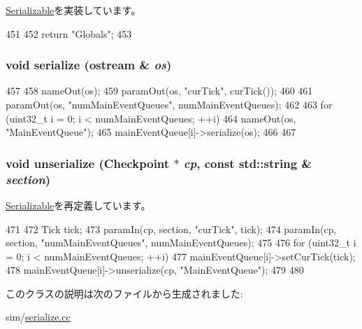 \hyperlink{classSerializable_a2d319721a65496069642871a52e47056}{Serializable}を実装しています。


\begin{DoxyCode}
451 {
452     return "Globals";
453 }
\end{DoxyCode}
\hypertarget{classGlobals_a21e39b74fa4d4676016935883b644bc4}{
\subsubsection[{serialize}]{\setlength{\rightskip}{0pt plus 5cm}void serialize (ostream \& {\em os})}}
\label{classGlobals_a21e39b74fa4d4676016935883b644bc4}



\begin{DoxyCode}
457 {
458     nameOut(os);
459     paramOut(os, "curTick", curTick());
460 
461     paramOut(os, "numMainEventQueues", numMainEventQueues);
462 
463     for (uint32_t i = 0; i < numMainEventQueues; ++i) {
464         nameOut(os, "MainEventQueue");
465         mainEventQueue[i]->serialize(os);
466     }
467 }
\end{DoxyCode}
\hypertarget{classGlobals_af22e5d6d660b97db37003ac61ac4ee49}{
\subsubsection[{unserialize}]{\setlength{\rightskip}{0pt plus 5cm}void unserialize ({\bf Checkpoint} $\ast$ {\em cp}, \/  const std::string \& {\em section})}}
\label{classGlobals_af22e5d6d660b97db37003ac61ac4ee49}


\hyperlink{classSerializable_af100c4e9feabf3cd918619c88c718387}{Serializable}を再定義しています。


\begin{DoxyCode}
471 {
472     Tick tick;
473     paramIn(cp, section, "curTick", tick);
474     paramIn(cp, section, "numMainEventQueues", numMainEventQueues);
475 
476     for (uint32_t i = 0; i < numMainEventQueues; ++i) {
477         mainEventQueue[i]->setCurTick(tick);
478         mainEventQueue[i]->unserialize(cp, "MainEventQueue");
479     }
480 }
\end{DoxyCode}


このクラスの説明は次のファイルから生成されました:\begin{DoxyCompactItemize}
\item 
sim/\hyperlink{serialize_8cc}{serialize.cc}\end{DoxyCompactItemize}
